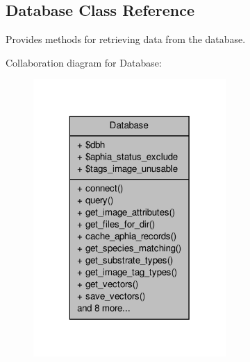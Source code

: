 \hypertarget{classDatabase}{\subsection{Database Class Reference}
\label{classDatabase}
}


Provides methods for retrieving data from the database.  




Collaboration diagram for Database\-:\nopagebreak
\begin{figure}[H]
\begin{center}
\leavevmode
\includegraphics[width=208pt]{classDatabase__coll__graph}
\end{center}
\end{figure}
